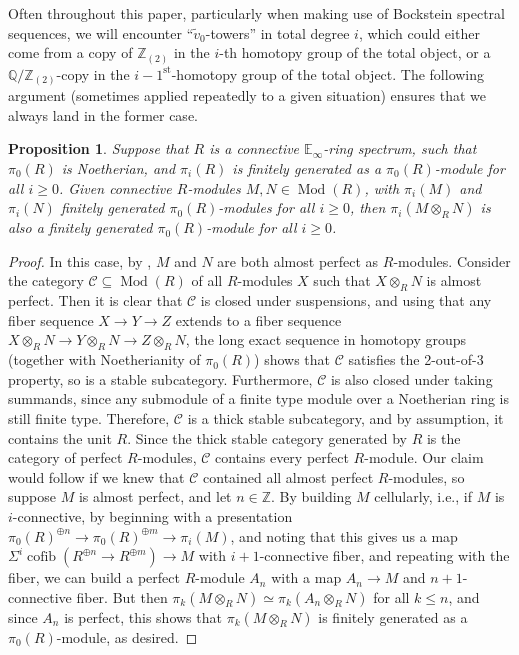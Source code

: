 \documentclass[11pt,leqno]{article}
\newcommand{\zz}{\mathbb{Z}}
\newcommand{\bb}[1]{\mathbb{#1}}
\newcommand{\mc}[1]{\mathcal{#1}}
\newcommand{\mo}[1]{\operatorname{#1}}
\newtheorem*{short hand}{theorem name}
\theoremstyle{plain}  %
\newtheorem{proposition}{Proposition}[section]
\theoremstyle{definition}
\numberwithin{equation}{section}
\begin{document}
Often throughout this paper, particularly when making use of Bockstein spectral sequences, we will encounter ``$\tilde{v}_0$-towers'' in total degree $i$, which could either come from a copy of $\zz_{(2)}$ in the $i$-th homotopy group of the total object, or a $\bb{Q}/\zz_{(2)}$-copy in the $i-1^{\text{st}}$-homotopy group of the total object.  The following argument (sometimes applied repeatedly to a given situation) ensures that we always land in the former case.
\begin{proposition}\label{proposition2.11}
Suppose that $R$ is a connective $\bb{E}_{\infty}$-ring spectrum, such that $\pi_0(R)$ is Noetherian, and $\pi_i(R)$ is finitely generated as a $\pi_0(R)$-module for all $i\geq 0$.  Given connective $R$-modules $M,N\in\mo{Mod}(R)$, with $\pi_i(M)$ and $\pi_i(N)$ finitely generated $\pi_0(R)$-modules for all $i\geq 0$, then $\pi_i(M\otimes_R N)$ is also a finitely generated $\pi_0(R)$-module for all $i\geq 0$.
\end{proposition}
\begin{proof}
In this case, by \cite[~Proposition 7.2.4.17]{HA}, $M$ and $N$ are both almost perfect as $R$-modules.  Consider the category $\mc{C}\subseteq \mo{Mod}(R)$ of all $R$-modules $X$ such that $X\otimes_{R} N$ is almost perfect.  Then it is clear that $\mc{C}$ is closed under suspensions, and using that any fiber sequence $X\to Y \to Z$ extends to a fiber sequence $X\otimes_R N\to Y\otimes_R N\to Z\otimes_R N$, the long exact sequence in homotopy groups (together with Noetherianity of $\pi_0(R)$) shows that $\mc{C}$ satisfies the 2-out-of-3 property, so is a stable subcategory.  Furthermore, $\mc{C}$ is also closed under taking summands, since any submodule of a finite type module over a Noetherian ring is still finite type.  Therefore, $\mc{C}$ is a thick stable subcategory, and by assumption, it contains the unit $R$.  Since the thick stable category generated by $R$ is the category of perfect $R$-modules, $\mc{C}$ contains every perfect $R$-module.  Our claim would follow if we knew that $\mc{C}$ contained all almost perfect $R$-modules, so suppose $M$ is almost perfect, and let $n\in\zz $.  By building $M$ cellularly, i.e., if $M$ is $i$-connective, by beginning with a presentation $\pi_0(R)^{\oplus n}\to \pi_0(R)^{\oplus m}\to \pi_i(M)$, and noting that this gives us a map $\Sigma^{i}\mo{cofib}(R^{\oplus n}\to R^{\oplus m})\to M$ with $i+1$-connective fiber, and repeating with the fiber, we can build a perfect $R$-module $A_n$ with a map $A_n\to M$ and $n+1$-connective fiber.  But then $\pi_k(M\otimes_{R} N)\simeq \pi_k(A_n\otimes_{R}N)$ for all $k\leq n$, and since $A_n$ is perfect, this shows that $\pi_k(M\otimes_{R}N)$ is finitely generated as a $\pi_0(R)$-module, as desired.
\end{proof}
\end{document}
